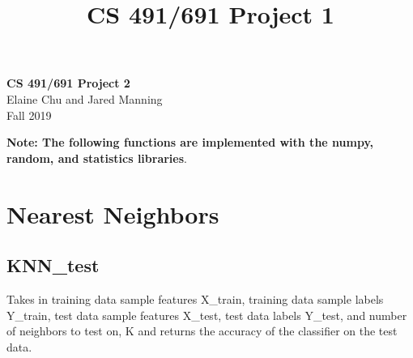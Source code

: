 \documentclass[11pt]{article}
\theoremstyle{definition}
\begin{document}
\setcounter{section}{0}
\title{CS 491/691 Project 1}

\thispagestyle{empty}

\begin{center}
{\LARGE \bf CS 491/691 Project 2}\\
{\large Elaine Chu and Jared Manning}\\
Fall 2019
\end{center}

\textbf{Note: The following functions are implemented with the \textsf{numpy}, \textsf{random}, and \textsf{statistics} libraries}.

\section{Nearest Neighbors}
\subsection{KNN\_test}
Takes in training data sample features \textsf{X\_train}, training data sample labels \textsf{Y\_train}, test data sample features \textsf{X\_test}, test data labels \textsf{Y\_test}, and number of neighbors to test on, \textsf{K} and returns the accuracy of the classifier on the test data.
\end{document}
